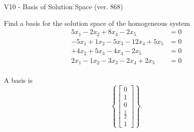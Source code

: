 \begin{exercise}
  \begin{exerciseTitle}V10 - Basis of Solution Space (ver. 868)\end{exerciseTitle}
  \begin{exerciseStatement}
    Find a basis for the solution space of the homogeneous system 
\begin{align*}
 5 x_ 1 -2 x_ 2 + 8 x_ 4 -2 x_ 5 &= 0  \\ 
  -5 x_ 1 + 1 x_ 2 -5 x_ 3 -12 x_ 4 + 5 x_ 5 &= 0  \\ 
  + 4 x_ 2 + 5 x_ 3 -4 x_ 4 -2 x_ 5 &= 0  \\ 
  2 x_ 1 -1 x_ 2 -3 x_ 3 -2 x_ 4 + 2 x_ 5 &= 0  \\ 
 \end{align*}


 
  \end{exerciseStatement}

  \begin{exerciseAnswer}
   A basis is   
\[\left\{\left[\begin{array}{c}
0 \\
1 \\
0 \\
\frac{1}{2} \\
1
\end{array}\right]\right\}.\]

  


  \end{exerciseAnswer}
\end{exercise}